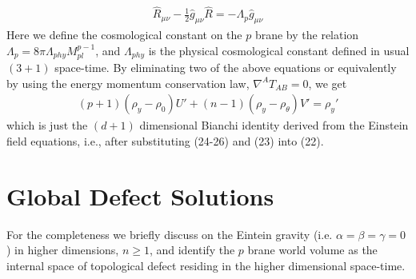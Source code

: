 \documentclass[a4paper,12pt]{article}
\begin{document}
\begin{eqnarray}
\hat{R}_{\mu\nu} - \frac{1}{2} \hat{g}_{\mu\nu} \hat{R} 
= - \Lambda_p \hat{g}_{\mu\nu}
\end{eqnarray}
Here we define the cosmological constant on the $p$ brane by the relation 
$\Lambda_p=8\pi\Lambda_{phy} M_{pl}^{p-1}$, and $\Lambda_{phy}$ is the 
physical cosmological constant defined in usual $(3+1)$ space-time. By 
eliminating two of the above equations or equivalently by using the 
energy momentum conservation law, $\nabla^A T_{AB}=0$, we get
\begin{eqnarray}
(p+1)(\rho_y-\rho_0)U'+(n-1)(\rho_y-\rho_{\theta})V'=\rho_y'
\end{eqnarray}
which is just the $(d+1)$ dimensional Bianchi identity derived from the 
Einstein field equations, i.e., after substituting (24-26) and (23) into (22).
\section{Global Defect Solutions}
   For the completeness we briefly discuss on the Eintein gravity 
(i.e. $\alpha=\beta=\gamma=0$) in higher dimensions, $n\geq 1$, and identify 
the $p$ brane world volume as the internal space of topological defect 
residing in the higher dimensional space-time.  
\end{document}
